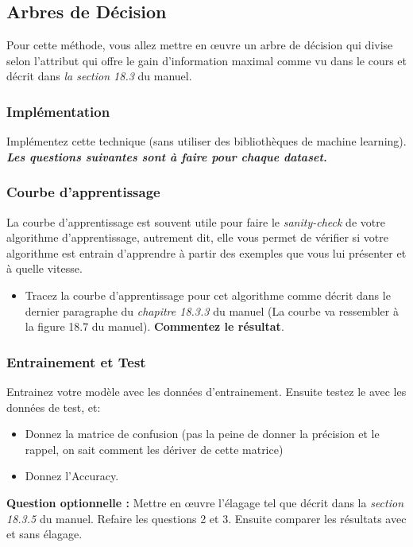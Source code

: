\documentclass[latter,12pt]{article}
\begin{document}
\subsection{Arbres de Décision}
Pour cette méthode, vous allez mettre en œuvre un arbre de décision qui divise selon l'attribut qui offre le gain d'information maximal comme vu dans le cours et décrit dans \emph{la section 18.3} du manuel.

\subsubsection{Implémentation}
Implémentez cette technique (sans utiliser des bibliothèques de machine learning). \textbf{\textit{Les questions suivantes sont à faire pour chaque dataset.}}






\subsubsection{Courbe d'apprentissage}
La courbe d'apprentissage est souvent utile pour faire le \emph{sanity-check} de votre algorithme d'apprentissage, autrement dit, elle vous permet de vérifier si votre algorithme est entrain d'apprendre à partir des exemples que vous lui présenter et à quelle vitesse.
\begin{itemize}
\item Tracez la courbe d'apprentissage pour cet algorithme comme décrit dans le dernier paragraphe du \emph{chapitre 18.3.3} du manuel (La courbe va ressembler à la figure 18.7 du manuel). {\bf Commentez le résultat}.
\end{itemize}


\subsubsection{Entrainement et Test} 
Entrainez votre modèle avec les données d'entrainement. Ensuite testez le avec les données de test, et:
\begin{itemize}
\item Donnez la matrice de confusion (pas la peine de donner la précision et le rappel, on sait comment les dériver de cette matrice)
\item Donnez l'Accuracy.
\end{itemize}
	
\vspace{5mm}

{\bf Question optionnelle :} Mettre en œuvre l'élagage tel que décrit dans la \emph{section 18.3.5} du manuel. Refaire les questions 2 et 3. Ensuite comparer les résultats avec et sans élagage.
 
\end{document}
